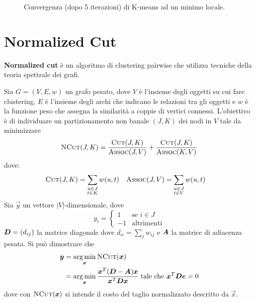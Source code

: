 \begin{figure}[h!]
	\centering
	\caption[Convergenza di K-means]{Convergenza (dopo 5 iterazioni) di K-means ad un minimo locale.}
\end{figure}

\section{Normalized Cut}
\label{sec:normalized_cut}

\textbf{Normalized cut} è un algoritmo di clustering pairwise che utilizza tecniche della teoria spettrale dei grafi.

Sia $G = (V, E, w)$ un grafo pesato, dove $V$ è l'insieme degli oggetti su cui fare clustering, $E$ è l'insieme degli archi che indicano le relazioni tra gli oggetti e $w$ è la funzione peso che assegna la similarità a coppie di vertici connessi. L'obiettivo è di individuare un partizionamento non banale $(J, K)$ dei nodi in $V$ tale da minimizzare
\begin{displaymath}
	\textsc{NCut}(J, K) = \frac{\textsc{Cut}(J, K)}{\textsc{Assoc}(J, V)} + \frac{\textsc{Cut}(J, K)}{\textsc{Assoc}(K, V)}
\end{displaymath}
dove:
\begin{align*}
	\textsc{Cut}(J, K) &= \sum_{\substack{u \in J \\ t \in K}} w(u, t) & \textsc{Assoc}(J, V) &= \sum_{\substack{u \in J \\ t \in V}} w(u, t)
\end{align*}
Sia $\vec{y}$ un vettore $|V|$-dimensionale, dove
\begin{displaymath}
	y_i = \begin{cases}
 		1 & \text{se } i \in J \\
 		-1 & \text{altrimenti}
 	\end{cases}
\end{displaymath}
$\mat{D} = (d_{ij})$ la matrice diagonale dove $d_{ii} = \sum_j w_{ij}$ e $\mat{A}$ la matrice di adiacenza pesata. Si può dimostrare che
\begin{align*}
	\vec{y} &= \argmin_{\vec{x}} \textsc{NCut}(\vec{x}) \\
	&= \argmin_{\vec{x}} \frac{\vec{x}^T (\mat{D} - \mat{A}) \vec{x}}{\vec{x}^T \mat{D} \vec{x}} \; \text{tale che } \vec{x}^T \mat{D} \vec{e} = 0
\end{align*}
dove con $\textsc{NCut}(\vec{x})$ si intende il costo del taglio normalizzato descritto da $\vec{x}$.

